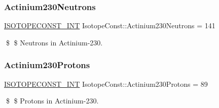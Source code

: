 \subsubsection{\texorpdfstring{Actinium230\+Neutrons}{Actinium230Neutrons}}
{\footnotesize\ttfamily \mbox{\hyperlink{group___isotope_const-_macros_ga5f18360b3e99483a35c32d789e62621c}{I\+S\+O\+T\+O\+P\+E\+C\+O\+N\+S\+T\+\_\+\+I\+NT}} Isotope\+Const\+::\+Actinium230\+Neutrons = 141}

\$ \$ Neutrons in Actinium-\/230. \mbox{\label{group___isotope_const-_actinium-_ac230_ga924e8fcd477abd2f77f5e42aa779db6c}} 
\subsubsection{\texorpdfstring{Actinium230\+Protons}{Actinium230Protons}}
{\footnotesize\ttfamily \mbox{\hyperlink{group___isotope_const-_macros_ga5f18360b3e99483a35c32d789e62621c}{I\+S\+O\+T\+O\+P\+E\+C\+O\+N\+S\+T\+\_\+\+I\+NT}} Isotope\+Const\+::\+Actinium230\+Protons = 89}

\$ \$ Protons in Actinium-\/230. 